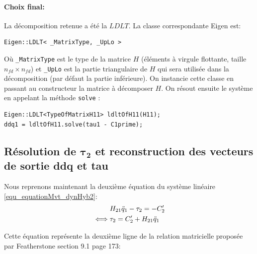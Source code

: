 \documentclass{report}
\begin{document}
\paragraph{Choix final:} La décomposition retenue a été la $LDLT$. La classe correspondante Eigen est:
\begin{verbatim}
Eigen::LDLT< _MatrixType, _UpLo >
\end{verbatim}
Où \verb;_MatrixType; est le type de la matrice $H$ (éléments à virgule flottante, taille $n_{fd} \times n_{fd}$) et \verb;_UpLo; est la partie triangulaire de $H$ qui sera utilisée dans la décomposition (par défaut la partie inférieure). On instancie cette classe en passant au constructeur la matrice à décomposer $H$. On résout ensuite le système en appelant la méthode \verb;solve; :
\begin{verbatim}
Eigen::LDLT<TypeOfMatrixH11> ldltOfH11(H11);
ddq1 = ldltOfH11.solve(tau1 - C1prime);
\end{verbatim}


\subsection{Résolution de $\mathbf{\tau_2}$ et reconstruction des vecteurs de sortie ddq et tau} \label{ch_impl_calculTau2}

Nous reprenons maintenant la deuxième équation du système linéaire \eqref{equ_equationMvt_dynHyb2}:
\begin{align}
&H_{21} \ddot{q}_1 - \tau_2 = -C'_2 \notag \\
\iff
&\tau_2 = C'_2 + H_{21} \ddot{q}_1 \label{equ_tau}
\end{align}

Cette équation représente la deuxième ligne de la relation matricielle proposée par Featherstone \cite{bib_featherstone} section 9.1 page 173:
\end{document}
